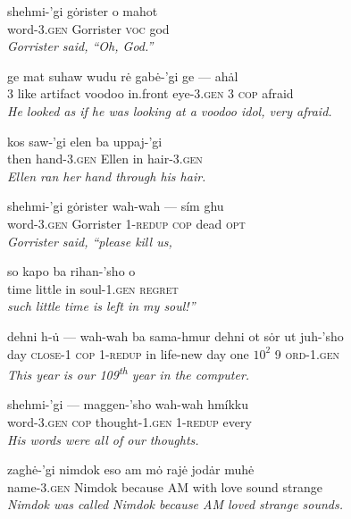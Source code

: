 \documentclass{article}[10pt]
\begin{document}
\begin{exe}
\ex
\gll shehmi-'gi g\.{o}rister o mahot\\
word-3.\textsc{gen} Gorrister \textsc{voc} god\\
\trans \emph{Gorrister said, ``Oh, God.''}

\ex
\gll ge mat suhaw wudu r\.{e} gab\.{e}-'gi ge --- ah\.{a}l\\
3 like artifact voodoo in.front eye-3.\textsc{gen} 3 \textsc{cop} afraid\\
\trans \emph{He looked as if he was looking at a voodoo idol, very afraid.}

\ex
\gll kos saw-'gi elen ba uppaj-'gi\\
then hand-3.\textsc{gen} Ellen in hair-3.\textsc{gen}\\
\trans \emph{Ellen ran her hand through his hair.}

\ex
\gll shehmi-'gi g\.{o}rister wah-wah --- s\'{i}m ghu\\
word-3.\textsc{gen} Gorrister 1-\textsc{redup} \textsc{cop} dead \textsc{opt}\\
\trans \emph{Gorrister said, ``please kill us,}

\ex
\gll so kapo ba rihan-'sho o\\
time little in soul-1.\textsc{gen} \textsc{regret}\\
\trans \emph{such little time is left in my soul!''}


\ex
\gll dehni h-\.{u} --- wah-wah ba sama-hmur dehni ot s\.{o}r ut juh-'sho\\
day \textsc{close}-1 \textsc{cop} 1-\textsc{redup} in life-new day one $10^2$ 9 \textsc{ord}-1.\textsc{gen}\\
\trans \emph{This year is our 109\textsuperscript{th} year in the computer.}


\ex
\gll shehmi-'gi --- maggen-'sho wah-wah hm\'{i}kku\\
word-3.\textsc{gen} \textsc{cop} thought-1.\textsc{gen} 1-\textsc{redup} every\\
\trans \emph{His words were all of our thoughts.}


\ex 
\gll zagh\.{e}-'gi nimdok eso am m\.{o} raj\.{e} jod\.{a}r muh\.{e}\\
name-3.\textsc{gen} Nimdok because AM with love sound strange\\
\trans \emph{Nimdok was called Nimdok because AM loved strange sounds.}


\end{exe}
\end{document}
